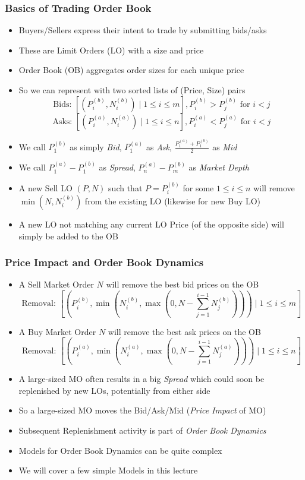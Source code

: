 \documentclass[handout]{beamer}
\begin{document}
\begin{frame}
\frametitle{Basics of Trading Order Book}
\pause
\begin{itemize}[<+->]
\item Buyers/Sellers express their intent to trade by submitting bids/asks
\item These are Limit Orders (LO) with a size and price
\item Order Book (OB) aggregates order sizes for each unique price
\item So we can represent with two sorted lists of (Price, Size) pairs
$$\mbox{Bids: } [(P_i^{(b)}, N_i^{(b)}) \mid 1 \leq i \leq m], P_i^{(b)} > P_j^{(b)} \mbox{ for } i < j$$
$$\mbox{Asks: } [(P_i^{(a)}, N_i^{(a)}) \mid 1 \leq i \leq n], P_i^{(a)} < P_j^{(a)} \mbox{ for } i < j$$
\item We call $P_1^{(b)}$ as simply {\em Bid}, $P_1^{(a)}$ as {\em Ask}, $\frac {P_1^{(a)} + P_1^{(b)}} 2$ as {\em Mid}
\item We call $P_1^{(a)} - P_1^{(b)}$ as {\em Spread}, $P_n^{(a)} - P_m^{(b)}$ as {\em Market Depth}
\item A new Sell LO $(P,N)$ such that $P = P_i^{(b)}$ for some $1\leq i \leq n$ will remove $\min(N, N_i^{(b)})$ from the existing LO (likewise for new Buy LO)
\item A new LO not matching any current LO Price (of the opposite side) will simply be added to the OB
\end{itemize}
\end{frame}

\begin{frame}
\frametitle{Price Impact and Order Book Dynamics}
\pause
\begin{itemize}[<+->]
\item A Sell Market Order $N$ will remove the best bid prices on the OB
$$\mbox{Removal: } [(P_i^{(b)}, \min(N_i^{(b)}, \max(0, N - \sum_{j=1}^{i-1} N_j^{(b)}))) \mid 1 \leq i \leq m]$$
\item A Buy Market Order $N$ will remove the best ask prices on the OB
$$\mbox{Removal: } [(P_i^{(a)}, \min(N_i^{(a)}, \max(0, N - \sum_{j=1}^{i-1} N_j^{(a)}))) \mid 1 \leq i \leq n]$$
\item A large-sized MO often results in a big {\em Spread} which could soon be replenished by new LOs, potentially from either side
\item So a large-sized MO moves the Bid/Ask/Mid ({\em Price Impact} of MO)
\item Subsequent Replenishment activity is part of {\em Order Book Dynamics}
\item Models for Order Book Dynamics can be quite complex
\item We will cover a few simple Models in this lecture
\end{itemize}
\end{frame}
\end{document}

